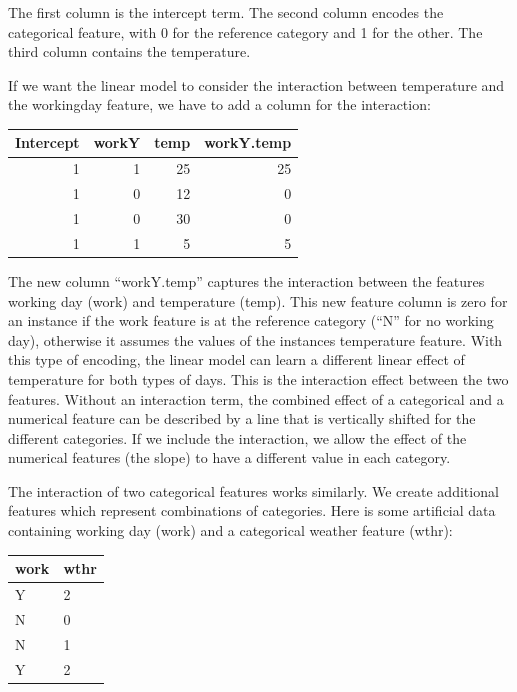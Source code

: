 \documentclass[
  11pt,
]{scrbook}
\begin{document}
The first column is the intercept term.
The second column encodes the categorical feature, with 0 for the reference category and 1 for the other.
The third column contains the temperature.

If we want the linear model to consider the interaction between temperature and the workingday feature, we have to add a column for the interaction:

\begin{table}
\centering
\begin{tabular}{rrrr}
\toprule
Intercept & workY & temp & workY.temp\\
\midrule
1 & 1 & 25 & 25\\
1 & 0 & 12 & 0\\
1 & 0 & 30 & 0\\
1 & 1 & 5 & 5\\
\bottomrule
\end{tabular}
\end{table}

The new column ``workY.temp'' captures the interaction between the features working day (work) and temperature (temp).
This new feature column is zero for an instance if the work feature is at the reference category (``N'' for no working day), otherwise it assumes the values of the instances temperature feature.
With this type of encoding, the linear model can learn a different linear effect of temperature for both types of days.
This is the interaction effect between the two features.
Without an interaction term, the combined effect of a categorical and a numerical feature can be described by a line that is vertically shifted for the different categories.
If we include the interaction, we allow the effect of the numerical features (the slope) to have a different value in each category.

The interaction of two categorical features works similarly.
We create additional features which represent combinations of categories.
Here is some artificial data containing working day (work) and a categorical weather feature (wthr):

\begin{table}
\centering
\begin{tabular}{ll}
\toprule
work & wthr\\
\midrule
Y & 2\\
N & 0\\
N & 1\\
Y & 2\\
\bottomrule
\end{tabular}
\end{table}
\end{document}
